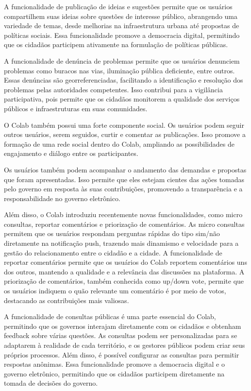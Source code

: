 A funcionalidade de publicação de ideias e sugestões permite que os usuários compartilhem suas ideias sobre questões de interesse público, abrangendo uma variedade de temas, desde melhorias na infraestrutura urbana até propostas de políticas sociais. Essa funcionalidade promove a democracia digital, permitindo que os cidadãos participem ativamente na formulação de políticas públicas.

A funcionalidade de denúncia de problemas permite que os usuários denunciem problemas como buracos nas vias, iluminação pública deficiente, entre outros. Essas denúncias são georreferenciadas, facilitando a identificação e resolução dos problemas pelas autoridades competentes. Isso contribui para a vigilância participativa, pois permite que os cidadãos monitorem a qualidade dos serviços públicos e infraestruturas em suas comunidades.

O Colab também possui uma forte componente social. Os usuários podem seguir outros usuários, serem seguidos, curtir e comentar as publicações. Isso promove a formação de uma rede social dentro do Colab, ampliando as possibilidades de engajamento e diálogo entre os participantes.

Os usuários também podem acompanhar o andamento das demandas e propostas que foram apresentadas. Isso permite que eles estejam cientes das ações tomadas pelo governo em resposta às suas contribuições, promovendo a transparência e a responsabilidade no governo eletrônico.

Além disso, o Colab introduziu recentemente novas funcionalidades, como micro consultas, reportar comentários e priorização de comentários. As micro consultas permitem que os usuários respondam perguntas rápidas do tipo sim/não diretamente na notificação push, trazendo mais dinamismo e velocidade para a gestão do relacionamento entre o cidadão e a cidade. A funcionalidade de reportar comentários permite que os usuários do Colab reportem comentários uns dos outros, mantendo a qualidade e a relevância das discussões na plataforma. A priorização de comentários, também conhecida como up/down vote, permite que os usuários indiquem o quão relevante um comentário é por meio de votos, destacando as contribuições mais valiosas.

A funcionalidade de consultas públicas é uma parte essencial do Colab, permitindo que os governos interajam diretamente com os cidadãos e obtenham feedback sobre várias questões. As consultas podem ser personalizadas para se adaptarem à realidade de cada território, e os gestores públicos podem criar seus próprios processos. Além disso, é possível configurar as consultas para permitir respostas anônimas. Essa funcionalidade promove a democracia digital e o governo eletrônico, permitindo que os cidadãos participem diretamente na tomada de decisões do governo.

